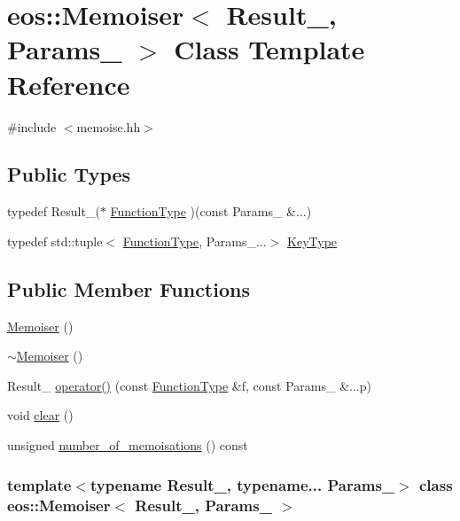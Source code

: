 \hypertarget{classeos_1_1Memoiser}{
\section{eos::Memoiser$<$ Result\_\-, Params\_\- $>$ Class Template Reference}
\label{classeos_1_1Memoiser}
}


{\ttfamily \#include $<$memoise.hh$>$}\subsection*{Public Types}
\begin{DoxyCompactItemize}
\item 
typedef Result\_\-($\ast$ \hyperlink{classeos_1_1Memoiser_a402c1728aaaf3737722674ebf9cb0644}{FunctionType} )(const Params\_\- \&...)
\item 
typedef std::tuple$<$ \hyperlink{classeos_1_1Memoiser_a402c1728aaaf3737722674ebf9cb0644}{FunctionType}, Params\_\-...$>$ \hyperlink{classeos_1_1Memoiser_aa17152256a324a1d43739567968c1736}{KeyType}
\end{DoxyCompactItemize}
\subsection*{Public Member Functions}
\begin{DoxyCompactItemize}
\item 
\hyperlink{classeos_1_1Memoiser_a85695c7a110fb1f7cda6dc8f0e0f311c}{Memoiser} ()
\item 
\hyperlink{classeos_1_1Memoiser_a5b4d3e39bc0d78776ca84f1ecfedb12f}{$\sim$Memoiser} ()
\item 
Result\_\- \hyperlink{classeos_1_1Memoiser_a3850676222d9601549fc69e3fa76e959}{operator()} (const \hyperlink{classeos_1_1Memoiser_a402c1728aaaf3737722674ebf9cb0644}{FunctionType} \&f, const Params\_\- \&...p)
\item 
void \hyperlink{classeos_1_1Memoiser_a353f1f69dd0ff3308fb585301f73b168}{clear} ()
\item 
unsigned \hyperlink{classeos_1_1Memoiser_ab3f142b5355fa1f2d8ee483aa4ad8982}{number\_\-of\_\-memoisations} () const 
\end{DoxyCompactItemize}
\subsubsection*{template$<$typename Result\_\-, typename... Params\_\-$>$ class eos::Memoiser$<$ Result\_\-, Params\_\- $>$}



